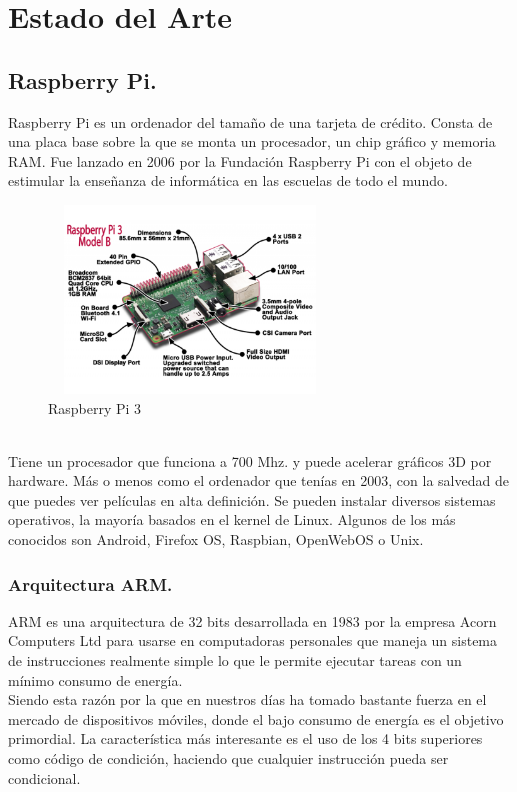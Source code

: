 \chapter{Estado del Arte} %

\section{Raspberry Pi.}

Raspberry Pi es un ordenador del tamaño de una tarjeta de crédito. Consta de una placa base sobre la que se monta un procesador, un chip gráfico y memoria RAM. Fue lanzado en 2006 por la Fundación Raspberry Pi con el objeto de estimular la enseñanza de informática en las escuelas de todo el mundo.

\begin{figure}[H]
\centering
\includegraphics[width=7.5cm, height=5cm]{./images/estado-arte/raspberry.png}
\caption{Raspberry Pi 3}
\label{fig:raspberry}
\end{figure}
\\
Tiene un procesador que funciona a 700 Mhz. y puede acelerar gráficos 3D por hardware. Más o menos como el ordenador que tenías en 2003, con la salvedad de que puedes ver películas en alta definición. Se pueden instalar diversos sistemas operativos, la mayoría basados en el kernel de Linux. Algunos de los más conocidos son Android, Firefox OS, Raspbian, OpenWebOS o Unix.

\subsection{Arquitectura ARM.}
ARM es una arquitectura de 32 bits desarrollada en 1983 por la empresa Acorn Computers Ltd para usarse en computadoras personales que maneja un sistema de instrucciones realmente simple lo que le permite ejecutar tareas con un mínimo consumo de energía.
\\ 

Siendo esta razón por la que en nuestros días ha tomado bastante fuerza en el mercado de dispositivos móviles, donde el bajo consumo de energía es el objetivo primordial. La característica más interesante es el uso de los 4 bits superiores como código de condición, haciendo que cualquier instrucción pueda ser condicional.
\\


